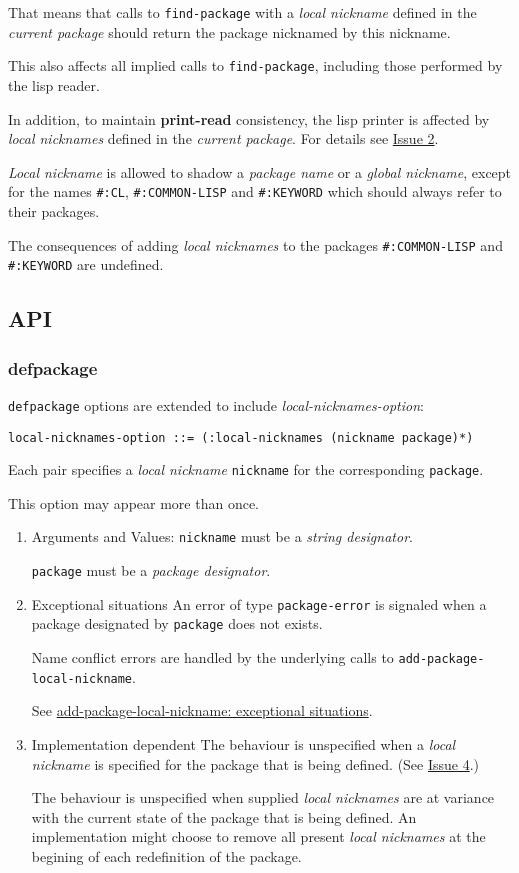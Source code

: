 \documentclass[11pt]{article}
\begin{document}
That means that calls to \texttt{find-package} with a \emph{local nickname} defined in the
\emph{current package} should return the package nicknamed by this nickname.

This also affects all implied calls to \texttt{find-package}, including those performed by
the lisp reader.

In addition, to maintain \textbf{print-read} consistency, the lisp printer is affected by
\emph{local nicknames} defined in the \emph{current package}.
For details see \hyperref[sec:orgdf64437]{Issue 2}.

\emph{Local nickname} is allowed to shadow a \emph{package name} or a \emph{global nickname},
except for the names \texttt{\#:CL}, \texttt{\#:COMMON-LISP} and \texttt{\#:KEYWORD} which should always
refer to their packages.

The consequences of adding \emph{local nicknames} to the packages \texttt{\#:COMMON-LISP} and
\texttt{\#:KEYWORD} are undefined.
\subsection{API}
\label{sec:orgd834ce8}
\subsubsection{defpackage}
\label{sec:org986ea92}
\texttt{defpackage} options are extended to include \emph{local-nicknames-option}:
\begin{verbatim}
local-nicknames-option ::= (:local-nicknames (nickname package)*)
\end{verbatim}


Each pair specifies a \emph{local nickname} \texttt{nickname} for the corresponding \texttt{package}.

This option may appear more than once.
\begin{enumerate}
\item Arguments and Values:
\label{sec:org42e883a}
\texttt{nickname} must be a \emph{string designator}.

\texttt{package} must be a \emph{package designator}.
\item Exceptional situations
\label{sec:orgdf2a684}
An error of type \texttt{package-error} is signaled when a package designated by
\texttt{package} does not exists.

Name conflict errors are handled by the underlying calls to
\texttt{add-package-local-nickname}.

See \hyperref[sec:org638abe8]{add-package-local-nickname: exceptional situations}.
\item Implementation dependent
\label{sec:org0e0e14f}
The behaviour is unspecified when a \emph{local nickname} is specified for the package
that is being defined. (See \hyperref[sec:org6067ecf]{Issue 4}.)

The behaviour is unspecified when supplied \emph{local nicknames} are at variance with
the current state of the package that is being defined. An implementation might
choose to remove all present \emph{local nicknames} at the begining of each
redefinition of the package.
\end{enumerate}
\end{document}
